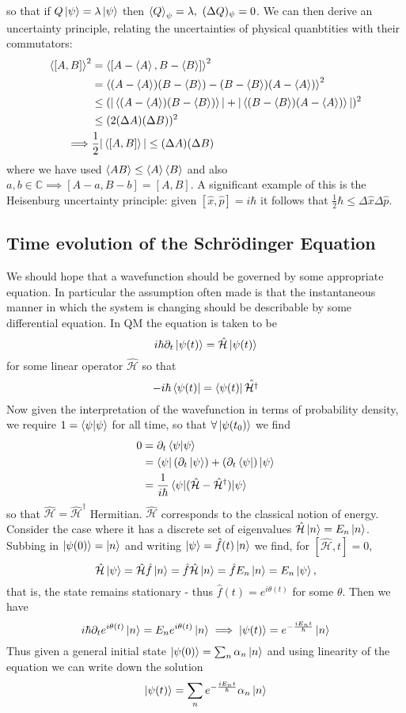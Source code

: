 \documentclass{article}
\begin{document}
so that if $Q\ket{\psi}=\lambda\ket{\psi}$ then $\braket{Q}_\psi=\lambda,~(\Delta Q)_\psi=0$.  We can then derive an uncertainty principle, relating the uncertainties of physical quanbtities with their commutators:
\begin{align*}
  \braket{[A,B]}^2&=\braket{[A-\braket{A},B-\braket{B}]}^2
  \\
  &=\braket{(A-\braket{A})(B-\braket{B})-(B-\braket{B})(A-\braket{A})}^2
  \\
  &\leq(|\braket{(A-\braket{A})(B-\braket{B})}|+|\braket{(B-\braket{B})(A-\braket{A})}|)^2
  \\
  &\leq(2(\Delta A)(\Delta B))^2
  \\
  \implies& \frac{1}{2}|\braket{[A,B]}|\leq(\Delta A)(\Delta B)
\end{align*}
where we have used $\braket{AB}\leq\braket{A}\braket{B}$ and also $a,b\in\mathbb{C}\implies[A-a,B-b]=[A,B]$.  A significant example of this is the Heisenburg uncertainty principle: given $[\hat{x},\hat{p}]=i\hbar$ it follows that $\frac{1}{2}\hbar\leq\Delta\hat{x}\Delta\hat{p}$.
\subsection{Time evolution of the Schr\"odinger Equation}
We should hope that a wavefunction should be governed by some appropriate equation.  In particular the assumption often made is that the instantaneous manner in which the system is changing should be describable by some differential equation.  In QM the equation is taken to be
$$
  i\hbar\partial_t\ket{\psi(t)}=\hat{\mathcal{H}}\ket{\psi(t)}
$$
for some linear operator $\hat{\mathcal H}$ so that
$$
  -i\hbar\bra{\psi(t)}=\bra{\psi(t)}\hat{\mathcal{H}^\dagger}
$$
Now given the interpretation of the wavefunction in terms of probability density, we require $1=\braket{\psi|\psi}$ for all time, so that $\forall\ket{\psi(t_0)}$ we find
\begin{align*}
  0&=\partial_t\braket{\psi|\psi}
  \\
  &=\bra{\psi}(\partial_t\ket{\psi})+(\partial_t\bra{\psi})\ket{\psi}
  \\
  &=\frac{1}{i\hbar}\braket{\psi|(\hat{\mathcal{H}}-\hat{\mathcal{H}}^\dagger)|\psi}
\end{align*}
so that $\hat{\mathcal{H}}=\hat{\mathcal{H}}^\dagger$ Hermitian.  $\hat{\mathcal{H}}$ corresponds to the classical notion of energy.  Consider the case where it has a discrete set of eigenvalues $\hat{\mathcal{H}}\ket{n}=E_n\ket{n}$.  Subbing in $\ket{\psi(0)}=\ket{n}$ and writing $\ket\psi=\hat f(t)\ket n$ we find, for $[\hat{\mathcal{H}},t]=0$,
$$
  \hat{\mathcal H}\ket\psi=\hat{\mathcal H}\hat f\ket n=\hat f\hat{\mathcal H}\ket n=\hat fE_n\ket n=E_n\ket\psi,
$$
that is, the state remains stationary - thus $\hat f(t)=e^{i\theta(t)}$ for some $\theta$.  Then we have
$$
  i\hbar\partial_te^{i\theta(t)}\ket n=E_ne^{i\theta(t)}\ket n\implies \ket{\psi(t)}=e^{-\frac{iE_nt}{\hbar}}\ket n
$$
Thus given a general initial state $\ket{\psi(0)}=\sum_n\alpha_n\ket n$ and using linearity of the equation we can write down the solution
$$
  \ket{\psi(t)}=\sum_ne^{-\frac{iE_nt}{\hbar}}\alpha_n\ket n
$$
\end{document}
